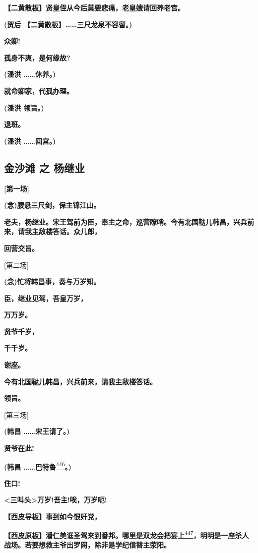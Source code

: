 \textbf{【二黄散板】贤皇侄从今后莫要悲痛，老皇嫂请回养老宫。}

\textbf{(贺后 【二黄散板】\ldots{}\ldots{}三尺龙泉不容留。)}

\textbf{众卿!}

\textbf{孤身不爽，是何缘故?}

\textbf{(潘洪 \ldots{}\ldots{}休养。)}

\textbf{就命卿家，代孤办理。}

\textbf{(潘洪 领旨。)}

\textbf{退班。}

\textbf{(潘洪 \ldots{}\ldots{}回宫。)}

\hypertarget{ux91d1ux6c99ux6ee9-ux4e4b-ux6768ux7ee7ux4e1a}{%
\subsection{金沙滩 之
杨继业}\label{ux91d1ux6c99ux6ee9-ux4e4b-ux6768ux7ee7ux4e1a}}

\textbf{{[}第一场{]}}

\textbf{(念)腰悬三尺剑，保主锦江山。}

\textbf{老夫，杨继业。宋王驾前为臣，奉主之命，巡营瞭哨。今有北国鞑儿韩昌，兴兵前来，请我主敌楼答话。众儿郎，}

\textbf{回营交旨。}

{[}第二场{]}

\textbf{(念)忙将韩昌事，奏与万岁知。}

\textbf{臣，继业见驾，吾皇万岁，}

\textbf{万万岁。}

\textbf{贤爷千岁，}

\textbf{千千岁。}

\textbf{谢座。}

\textbf{今有北国鞑儿韩昌，兴兵前来，请我主敌楼答话。}

\textbf{领旨。}

{[}第三场{]}

\textbf{(韩昌 \ldots{}\ldots{}宋王请了。)}

\textbf{贤爷在此!}

\textbf{(韩昌
\ldots{}\ldots{}巴特鲁}\protect\hyperlink{fn446}{\textsuperscript{446}}\textbf{。)}

\textbf{住口!}

\textbf{\textless{}三叫头\textgreater{}万岁!吾主!唉，万岁呃!}

\textbf{【西皮导板】事到如今恨奸党，}

\textbf{【西皮原板】潘仁美诓圣驾来到番邦。哪里是双龙会把宴上}\protect\hyperlink{fn447}{\textsuperscript{447}}\textbf{，明明是一座杀人战场。若要想救主爷出罗网，除非是学纪信替主荥阳。}

